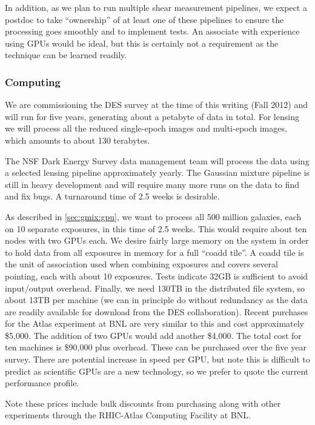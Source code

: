 \documentclass[12pt]{article}
\newcommand{\commissdate}{Fall 2012}
\begin{document}
In addition, as we plan to run multiple shear measurement pipelines, we expect
a postdoc to take ``ownership'' of at least one of these pipelines to ensure
the processing goes smoothly and to implement tests.  An associate with
experience using GPUs would be ideal, but this is certainly not a requirement
as the technique can be learned readily.

\subsubsection{Computing} \label{sec:computing}

We are commissioning the DES survey at the time of this writing (\commissdate)
and will run for five years, generating about a petabyte of data in total.  For
lensing we will process all the reduced single-epoch images and multi-epoch
images, which amounts to about 130 terabytes.

The NSF Dark Energy Survey data management team will process the data using a
selected lensing pipeline approximately yearly.  The Gaussian mixture pipeline
is still in heavy development and will require many more runs on the data to
find and fix bugs.  A turnaround time of 2.5 weeks is desirable.

As described in \ref{sec:gmix:gpu}, we want to process all 500 million
galaxies, each on 10 separate exposures, in this time of 2.5 weeks. This would
require about ten nodes with two GPUs each.  We desire fairly large memory on
the system in order to hold data from all exposures in memory for a full
``coadd tile''. A coadd tile is the unit of association used when combining
exposures and covers several pointing, each with about 10 exposures.  Tests
indicate 32GB is sufficient to avoid input/output overhead.  Finally, we need
130TB in the distributed file system, so about 13TB per machine (we can in
principle do without redundancy as the data are readily available for download
from the DES collaboration).  Recent purchases for the Atlas experiment at BNL
are very similar to this and cost approximately \$5,000.  The addition of two
GPUs would add another \$4,000. The total cost for ten machines is \$90,000
plus overhead.  These can be purchased over the five year survey. There are
potential increase in speed per GPU, but note this is difficult to predict as
scientific GPUs are a new technology, so we prefer to quote the current
performance profile.

Note these prices include bulk discounts from purchasing along with other
experiments through the RHIC-Atlas Computing Facility at BNL.  
\end{document}
